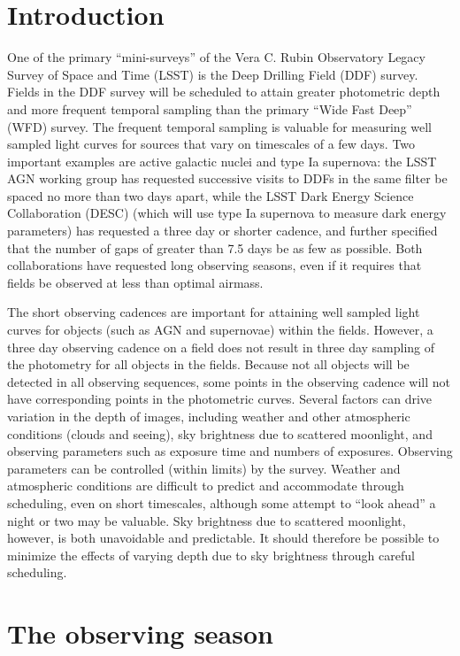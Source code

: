 \documentclass[DM,authoryear,toc]{lsstdoc}
\begin{document}
\section{Introduction}

One of the primary ``mini-surveys'' of the Vera C. Rubin Observatory Legacy Survey of Space and Time (LSST) is the Deep Drilling Field (DDF) survey. Fields in the DDF survey will be scheduled to attain greater photometric depth and more frequent temporal sampling than the primary ``Wide Fast Deep'' (WFD) survey.
The frequent temporal sampling is valuable for measuring well sampled light curves for sources that vary on timescales of a few days.
Two important examples are active galactic nuclei and type Ia supernova: the LSST AGN working group has requested successive visits to DDFs in the same filter be spaced no more than two days apart, while the LSST Dark Energy Science Collaboration (DESC) (which will use type Ia supernova to measure dark energy parameters) has requested a three day or shorter cadence, and further specified that the number of gaps of greater than 7.5 days be as few as possible.
Both collaborations have requested long observing seasons, even if it requires that fields be observed at less than optimal airmass.

The short observing cadences are important for attaining well sampled light curves for objects (such as AGN and supernovae) within the fields.
However, a three day observing cadence on a field does not result in three day sampling of the photometry for all objects in the fields.
Because not all objects will be detected in all observing sequences, some points in the observing cadence will not have corresponding points in the photometric curves.
Several factors can drive variation in the depth of images, including weather and other atmospheric conditions (clouds and seeing), sky brightness due to scattered moonlight, and observing parameters such as exposure time and numbers of exposures.
Observing parameters can be controlled (within limits) by the survey.
Weather and atmospheric conditions are difficult to predict and accommodate through scheduling, even on short timescales, although some attempt to ``look ahead'' a night or two may be valuable.
Sky brightness due to scattered moonlight, however, is both unavoidable and predictable.
It should therefore be possible to minimize the effects of varying depth due to sky brightness through careful scheduling.

\section{The observing season}
\end{document}
